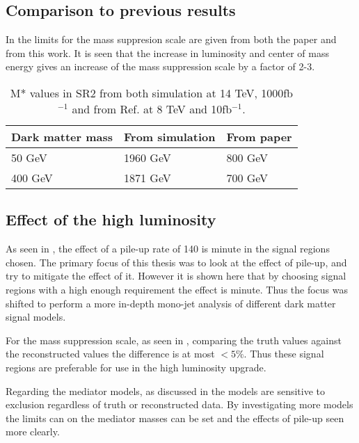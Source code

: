 \subsection{Comparison to previous results}
In  the limits for the mass suppresion scale are given from both the paper and from this work. It is seen that the increase in luminosity and center of mass energy gives an increase of the mass suppression scale by a factor of 2-3.

\begin{table}[ht]
\begin{center}
\begin{tabular}{|l|l|l|}
\hline
Dark matter mass & From simulation & From paper \\ \hline
50 GeV & 1960 GeV &800 GeV \\
400 GeV & 1871 GeV & 700 GeV \\ \hline
\end{tabular}
\caption{M* values in SR2 from both simulation at 14 TeV, 1000fb$^{-1}$ and from Ref. \citep{ATLAS-CONF-2012-147} at 8 TeV and 10fb$^{-1}$. }
\label{Comp pval}
\end{center}
\end{table}

\subsection{Effect of the high luminosity}\label{subsec:hleff}
As seen in , the effect of a pile-up rate of 140 is minute in the signal regions chosen. The primary focus of this thesis was to look at the effect of pile-up, and try to mitigate the effect of it. However it is shown here that by choosing signal regions with a high enough requirement the effect is minute. Thus the focus was shifted to perform a more in-depth mono-jet analysis of different dark matter signal models. 

For the mass suppression scale, as seen in , comparing the truth values against the reconstructed values the difference is at most $<5 \% $. Thus these signal regions are preferable for use in the high luminosity upgrade. 

Regarding the mediator models, as discussed in  the models are sensitive to exclusion regardless of truth or reconstructed data. By investigating more models the limits can on the mediator masses can be set and the effects of pile-up seen more clearly.

